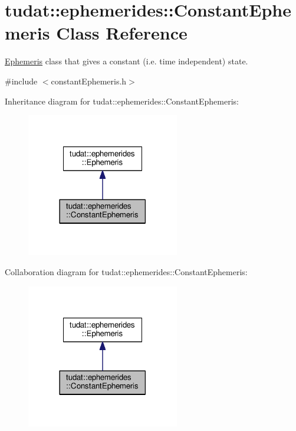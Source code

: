 \hypertarget{classtudat_1_1ephemerides_1_1ConstantEphemeris}{}\section{tudat\+:\+:ephemerides\+:\+:Constant\+Ephemeris Class Reference}
\label{classtudat_1_1ephemerides_1_1ConstantEphemeris}


\hyperlink{classtudat_1_1ephemerides_1_1Ephemeris}{Ephemeris} class that gives a constant (i.\+e. time independent) state.  




{\ttfamily \#include $<$constant\+Ephemeris.\+h$>$}



Inheritance diagram for tudat\+:\+:ephemerides\+:\+:Constant\+Ephemeris\+:
\nopagebreak
\begin{figure}[H]
\begin{center}
\leavevmode
\includegraphics[width=189pt]{classtudat_1_1ephemerides_1_1ConstantEphemeris__inherit__graph}
\end{center}
\end{figure}


Collaboration diagram for tudat\+:\+:ephemerides\+:\+:Constant\+Ephemeris\+:
\nopagebreak
\begin{figure}[H]
\begin{center}
\leavevmode
\includegraphics[width=189pt]{classtudat_1_1ephemerides_1_1ConstantEphemeris__coll__graph}
\end{center}
\end{figure}
